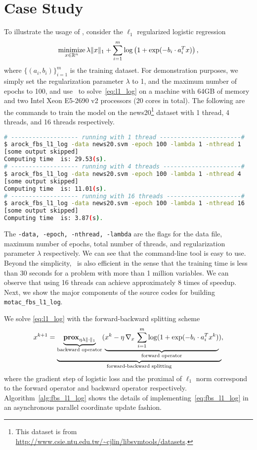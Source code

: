 \section{Case Study}\label{sec:quick_start}
To illustrate the  usage of \pkg, consider the $\ell_1$ regularized logistic regression~\citep{ng2004feature}
\begin{equation}\label{eq:l1_log}
\operatorname*{minimize}_{x \in \mathbb{R}^n} \lambda \|x\|_1 + \sum_{i = 1}^m \log\left(1 + \exp(-b_i \cdot a_i^T x)\right),
\end{equation}
where $\{(a_i, b_i)\}_{i = 1}^m$ is the training dataset. For demonstration purposes, we simply set the regularization parameter
$\lambda$ to 1, and the maximum number of epochs to 100, and use \pkg~to solve~\eqref{eq:l1_log} on a machine with 64GB of memory and two Intel Xeon E5-2690 v2 processors (20 cores in total). The following are the commands to train the model
on the news20\footnote{ This dataset is from \url{http://www.csie.ntu.edu.tw/~cjlin/libsvmtools/datasets}.}
dataset with 1 thread, 4 threads, and 16 threads respectively.
\begin{lstlisting}[language=bash]
# ------------------- running with 1 thread -----------------------#
$ arock_fbs_l1_log -data news20.svm -epoch 100 -lambda 1 -nthread 1 
[some output skipped]
Computing time  is: 29.53(s).
# ------------------- running with 4 threads ----------------------#
$ arock_fbs_l1_log -data news20.svm -epoch 100 -lambda 1 -nthread 4 
[some output skipped]
Computing time  is: 11.01(s).
# ------------------- running with 16 threads ---------------------#
$ arock_fbs_l1_log -data news20.svm -epoch 100 -lambda 1 -nthread 16
[some output skipped]
Computing time  is: 3.87(s).
\end{lstlisting}
The \texttt{-data, -epoch, -nthread, -lambda} are the flags for the data file, maximum number of epochs,
total number of threads, and regularization parameter $\lambda$ respectively. We can see that the command-line
tool is easy to use. Beyond the simplicity, \pkg~is also efficient in the sense that the training time is
less than 30 seconds for a problem with more than 1 million variables. We can observe that using 16 threads can achieve approximately 8 times of speedup. Next, we show the major components of the source
codes for building \texttt{motac\_fbs\_l1\_log}.

We solve \eqref{eq:l1_log} with the forward-backward splitting scheme
\begin{equation}\label{eq:fbs_l1_log}
  x^{k+1} = \underbrace{\underbrace{\mathbf{prox}_{ \eta \lambda \|\cdot\|_1}}_{\text{backward operator}}
  (\underbrace{x^k - \eta \, \nabla_{x} \,\sum_{i = 1}^m \log (1 + \exp(-b_i \cdot a_i^T x^k)}_{\text{forward operator}})}_{\text{forward-backward splitting}},
\end{equation}  
where the gradient step of logistic loss and the proximal of $\ell_1$ norm correspond to the
forward operator and backward operator respectively. Algorithm~\ref{alg:fbs_l1_log} shows the details of
implementing~\eqref{eq:fbs_l1_log} in an asynchronous parallel coordinate update fashion.

